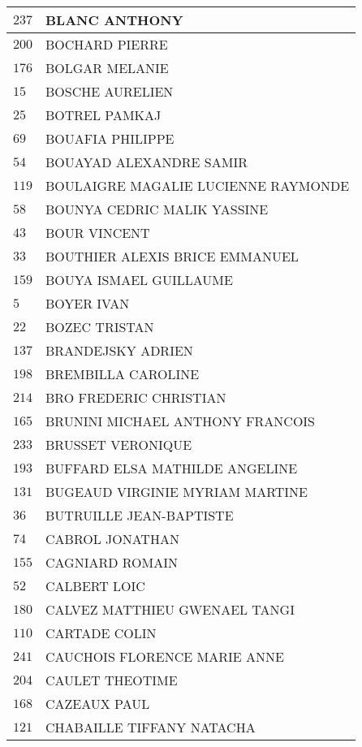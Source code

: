 \begin{xltabular}{\linewidth}{|l|X|}
    \hline
    $237$ & BLANC ANTHONY \\
    \hline
    $200$ & BOCHARD PIERRE \\
    \hline
    $176$ & BOLGAR MELANIE \\
    \hline
    $15$ & BOSCHE AURELIEN \\
    \hline
    $25$ & BOTREL PAMKAJ \\
    \hline
    $69$ & BOUAFIA PHILIPPE \\
    \hline
    $54$ & BOUAYAD ALEXANDRE SAMIR \\
    \hline
    $119$ & BOULAIGRE MAGALIE LUCIENNE RAYMONDE \\
    \hline
    $58$ & BOUNYA CEDRIC MALIK YASSINE \\
    \hline
    $43$ & BOUR VINCENT \\
    \hline
    $33$ & BOUTHIER ALEXIS BRICE EMMANUEL \\
    \hline
    $159$ & BOUYA ISMAEL GUILLAUME \\
    \hline
    $5$ & BOYER IVAN \\
    \hline
    $22$ & BOZEC TRISTAN \\
    \hline
    $137$ & BRANDEJSKY ADRIEN \\
    \hline
    $198$ & BREMBILLA CAROLINE \\
    \hline
    $214$ & BRO FREDERIC CHRISTIAN \\
    \hline
    $165$ & BRUNINI MICHAEL ANTHONY FRANCOIS \\
    \hline
    $233$ & BRUSSET VERONIQUE \\
    \hline
    $193$ & BUFFARD ELSA MATHILDE ANGELINE \\
    \hline
    $131$ & BUGEAUD VIRGINIE MYRIAM MARTINE \\
    \hline
    $36$ & BUTRUILLE JEAN-BAPTISTE \\
    \hline
    $74$ & CABROL JONATHAN \\
    \hline
    $155$ & CAGNIARD ROMAIN \\
    \hline
    $52$ & CALBERT LOIC \\
    \hline
    $180$ & CALVEZ MATTHIEU GWENAEL TANGI \\
    \hline
    $110$ & CARTADE COLIN \\
    \hline
    $241$ & CAUCHOIS FLORENCE MARIE ANNE \\
    \hline
    $204$ & CAULET THEOTIME \\
    \hline
    $168$ & CAZEAUX PAUL \\
    \hline
    $121$ & CHABAILLE TIFFANY NATACHA \\

\end{xltabular}
